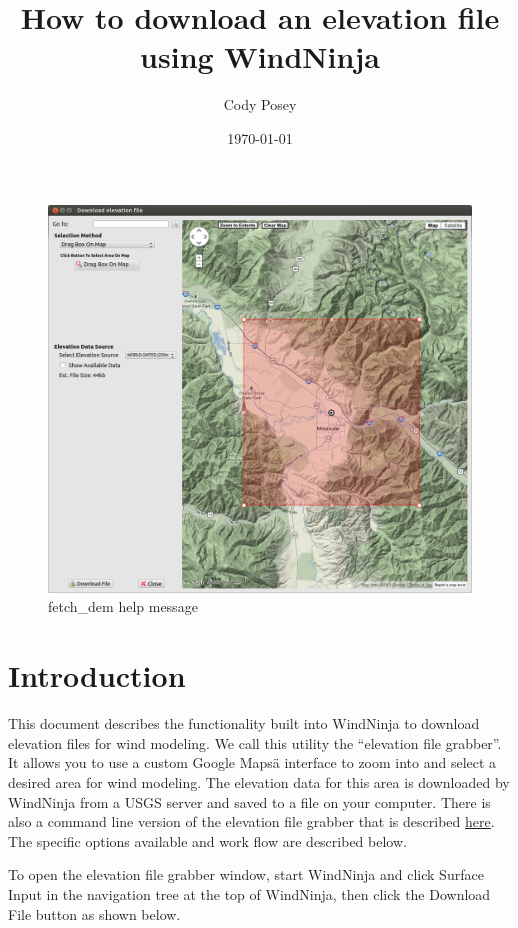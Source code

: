 \documentclass[12pt,oneside,final]{article}
\title{How to download an elevation file using WindNinja}
\author{Cody Posey}
\date{\today}
\begin{document}
\maketitle

\begin{figure}[ht!]
    \centering
    \includegraphics[width=7in]{images/download_dem_0.png}
    \caption{fetch\_dem help message}
\end{figure}

\section{Introduction}

This document describes the functionality built into WindNinja to download
elevation files for wind modeling.  We call this utility the “elevation file
grabber”.  It allows you to use a custom Google Mapsä interface to zoom into
and select a desired area for wind modeling. The elevation data for this area
is downloaded by WindNinja from a USGS server and saved to a file on your
computer.  There is also a command line version of the elevation file grabber
that is described \href{run:./fetch_dem_instructions.pdf}{here}.  The specific
options available and work flow are described below.

To open the elevation file grabber window, start WindNinja and click Surface
Input in the navigation tree at the top of WindNinja, then click the Download
File button as shown below.
\end{document}
